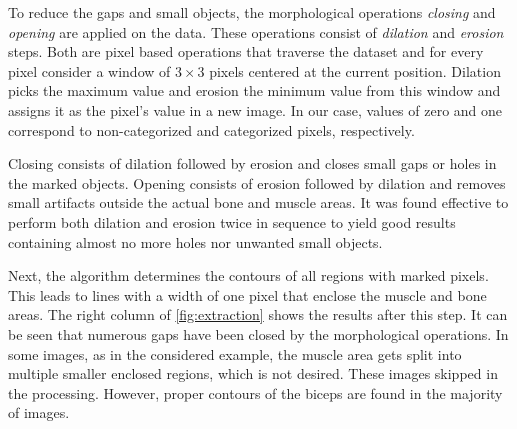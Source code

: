 To reduce the gaps and small objects, the morphological operations \emph{closing} and \emph{opening} are applied on the data. These operations consist of \emph{dilation} and \emph{erosion} steps. Both are pixel based operations that traverse the dataset and for every pixel consider a window of $3\times 3$ pixels centered at the current position. Dilation picks the maximum value and erosion the minimum value from this window and assigns it as the pixel's value in a new image. In our case, values of zero and one correspond to non-categorized and categorized pixels, respectively.

Closing consists of dilation followed by erosion and closes small gaps or holes in the marked objects. Opening consists of erosion followed by dilation and removes small artifacts outside the actual bone and muscle areas. It was found effective to perform both dilation and erosion twice in sequence to yield good results containing almost no more holes nor unwanted small objects.

Next, the algorithm determines the contours of all regions with marked pixels. This leads to lines with a width of one pixel that enclose the muscle and bone areas. The right column of \cref{fig:extraction} shows the results after this step. It can be seen that numerous gaps have been closed by the morphological operations. In some images, as in the considered example, the muscle area gets split into multiple smaller enclosed regions, which is not desired. These images skipped in the processing. However, proper contours of the biceps are found in the majority of images. 

